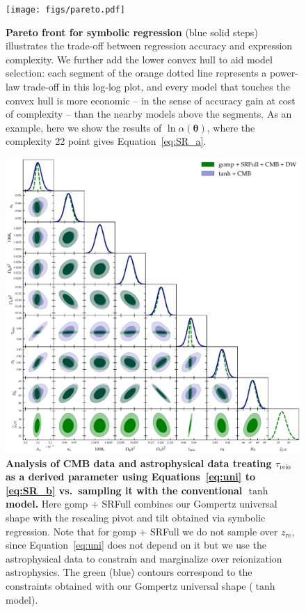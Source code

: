 \documentclass[12pt]{article}
\newcommand{\vtheta}{\boldsymbol{\theta}}
\newcommand{\re}{\mathrm{re}}
\newcommand{\reio}{\mathrm{reio}}
\newcommand{\ap}{\alpha}
\begin{document}
\begin{figure}
\centering
\texttt{[image: figs/pareto.pdf]}
\caption{\textbf{Pareto front for symbolic regression} (blue solid
steps) illustrates the trade-off between regression accuracy and
expression complexity.
We further add the lower convex hull to aid model selection: each
segment of the orange dotted line represents a power-law trade-off in
this log-log plot, and every model that touches the convex hull is more
economic -- in the sense of accuracy gain at cost of complexity -- than
the nearby models above the segments.
As an example, here we show the results of $\ln\ap(\vtheta)$, where the
complexity 22 point gives Equation~\eqref{eq:SR_a}.}
\label{fig:pareto}
\end{figure}

\begin{figure}
\centering
\includegraphics[width=\linewidth]{figs/gomp1dw_tanh_triangle_kill_full.pdf}
\caption{\textbf{\boldmath Analysis of CMB data and astrophysical data treating
$\tau_\reio$ as a derived parameter using
Equations~\eqref{eq:uni} to \eqref{eq:SR_b} vs.\ sampling it with the
conventional $\tanh$ model.}
Here gomp + SRFull combines our Gompertz universal shape with the
rescaling pivot and tilt obtained via symbolic regression.
Note that for gomp + SRFull we do not sample over $z_\re$, since
Equation~\eqref{eq:uni} does not depend on it but we use the astrophysical data to
constrain and marginalize over reionization astrophysics.
The green (blue) contours correspond to the constraints obtained with
our Gompertz universal shape ($\tanh$ model).}
\label{fig:unleashed_gomp}
\end{figure}
\end{document}
